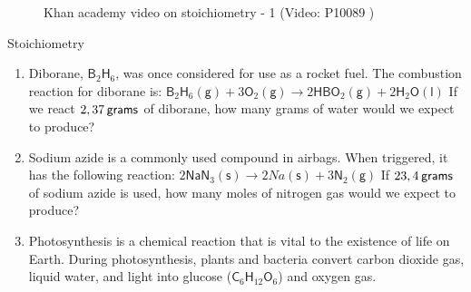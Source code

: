     \noindent
\label{m38712*eip-546}
    \setcounter{subfigure}{0}
	\begin{figure}[H] %
    \textnormal{Khan academy video on stoichiometry - 1}\vspace{.1in} \nopagebreak
  \label{m38712*yt-media4}\label{m38712*yt-video4}
             { (Video:  P10089 )}
      \vspace{2pt}
    \vspace{.1in}
 \end{figure}       \par \label{m38712*secfhsst!!!underscore!!!id2276}
            \begin{exercises}{  Stoichiometry
      }
            \nopagebreak
      \label{m38712*id285393}\begin{enumerate}[noitemsep, label=\textbf{\arabic*}. ] 
            \label{m38712*uid101}\item Diborane, $\mathsf{B}{}_{2}\mathsf{H}{}_{6}$, was once considered for use as a rocket fuel. The combustion reaction for diborane is:
${\mathsf{B}}_{2}{\mathsf{H}}_{6}\left(\mathsf{g}\right)+3{\mathsf{O}}_{2}\left(\mathsf{g}\right)\to 2\mathsf{H}\mathsf{B}{\mathsf{O}}_{2}\left(\mathsf{g}\right)+2{\mathsf{H}}_{2}\mathsf{O}\left(\mathsf{l}\right)$
If we react $2,37\phantom{\rule{2pt}{0ex}}\mathsf{grams}$ of diborane, how many grams of water would we expect to produce?\newline
\label{m38712*uid102}\item Sodium azide is a commonly used compound in airbags. When triggered, it has the following reaction:
$2{\mathsf{NaN}}_{3}\left(\mathsf{s}\right)\to 2Na\left(\mathsf{s}\right)+3{\mathsf{N}}_{2}\left(\mathsf{g}\right)$
If $23,4\phantom{\rule{2pt}{0ex}}\mathsf{grams}$ of sodium azide is used, how many moles of nitrogen gas would we expect to produce?\newline
\label{m38712*uid103}\item Photosynthesis is a chemical reaction that is vital to the existence of life on Earth. During photosynthesis, plants and bacteria convert carbon dioxide gas, liquid water, and light into glucose ($\mathsf{C}{}_{6}\mathsf{H}{}_{12}\mathsf{O}{}_{6}$) and oxygen gas.
\label{m38712*id285674}\begin{enumerate}[noitemsep, label=\textbf{\alph*}. ] 

\end{enumerate}
\end{enumerate}
\end{exercises}
